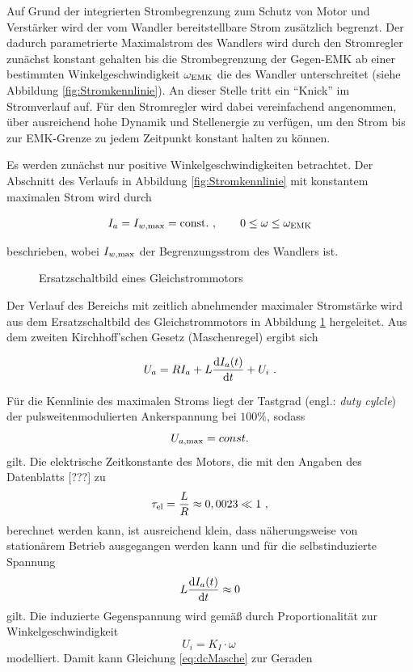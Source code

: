 Auf Grund der integrierten Strombegrenzung zum Schutz von Motor und Verstärker wird der vom Wandler bereitstellbare Strom zusätzlich begrenzt. Der dadurch parametrierte Maximalstrom des Wandlers wird durch den Stromregler zunächst konstant gehalten bis die Strombegrenzung der Gegen-EMK ab einer bestimmten Winkelgeschwindigkeit $\omega_{\mathrm{EMK}}$ die des Wandler unterschreitet (siehe Abbildung \ref{fig:Stromkennlinie}). An dieser Stelle tritt ein "`Knick"' im Stromverlauf auf. Für den Stromregler wird dabei vereinfachend angenommen, über ausreichend hohe Dynamik und Stellenergie zu verfügen, um den Strom bis zur EMK-Grenze zu jedem Zeitpunkt konstant halten zu können.

Es werden zunächst nur positive Winkelgeschwindigkeiten betrachtet. 
Der Abschnitt des Verlaufs in Abbildung \ref{fig:Stromkennlinie} mit konstantem maximalen Strom wird durch

\begin{equation}
	I_a  = I_{w\mrm{, max}} = \mrm{const.} \ , \qquad 0 \leq \omega \leq \omega_{\mrm{EMK}}
	\label{eq:Iconst}
\end{equation}

beschrieben, wobei $I_{w\mathrm{, max}}$ der Begrenzungsstrom des Wandlers ist.

\begin{figure}[h]
	\centering
		
	\caption{Ersatzschaltbild eines Gleichstrommotors}
	\label{fig:dcESB}
\end{figure}

Der Verlauf des Bereichs mit zeitlich abnehmender maximaler Stromstärke wird aus dem Ersatzschaltbild des Gleichstrommotors in Abbildung \ref{fig:dcESB} hergeleitet. Aus dem zweiten Kirchhoff'schen Gesetz (Maschenregel) ergibt sich

\begin{equation}
	U_a =  RI_a + L \frac{\mathrm{d}I_a(t)}{\mathrm{d}t} + U_i \ . 
	\label{eq:dcMasche}
\end{equation}

Für die Kennlinie des maximalen Stroms liegt der Tastgrad (engl.: \textit{duty cylcle}) der pulsweitenmodulierten Ankerspannung bei $100\%$, sodass 
\[
	U_{a \mathrm{, max}}  = const.
\]
gilt. Die elektrische Zeitkonstante des Motors, die mit den Angaben des Datenblatts [???] zu 
\[
	\tau_{\mathrm{el}} = \frac{L}{R} \approx 0,0023 \ll 1 \ ,
\]
berechnet werden kann, ist ausreichend klein, dass näherungsweise von stationärem Betrieb ausgegangen werden kann und für die selbstinduzierte Spannung 
\[
	L \frac{\mathrm{d}I_a(t)}{\mathrm{d}t} \approx 0
\]
gilt. Die induzierte Gegenspannung wird gemäß \cite{binder} durch Proportionalität zur Winkelgeschwindigkeit
\[
	U_i  = K_I \cdot \omega \ 
\]
modelliert.
Damit kann Gleichung \eqref{eq:dcMasche} zur Geraden

